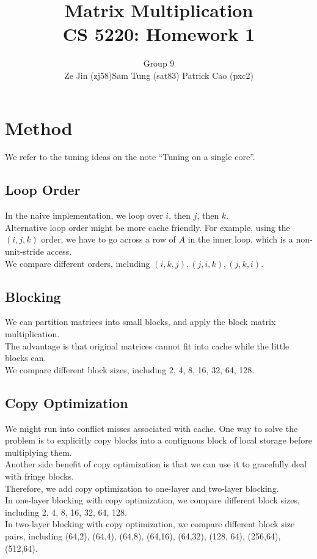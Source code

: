 \documentclass[12pt]{article}
\numberwithin{equation}{section}
\begin{document}
\title{\bf{Matrix Multiplication \\ CS 5220: Homework 1}}

\author{Group 9 \\ Ze Jin (zj58)\quad Sam Tung (sat83) \quad Patrick Cao (pxc2) \\}

\date{ }

\maketitle





\section{Method}

We refer to the tuning ideas on the note ``Tuning on a single core''.

\subsection{Loop Order}

In the naive implementation, we loop over $i$, then $j$, then $k$.
\\
Alternative loop order might be more cache friendly. For example, using the $(i,j,k)$ order, we have to go across a row of $A$ in the inner loop, which is a non-unit-stride access.
\\
We compare different orders, including $(i,k,j), (j,i,k), (j,k,i)$.

\subsection{Blocking}

We can partition matrices into small blocks, and apply the block matrix multiplication.
\\
The advantage is that original matrices cannot fit into cache while the little blocks can.
\\
We compare different block sizes, including 2, 4, 8, 16, 32, 64, 128.

\subsection{Copy Optimization}

We might run into conflict misses associated with cache. One way to solve the problem is to explicitly copy blocks into a contiguous block of local storage before multiplying them.
\\
Another side benefit of copy optimization is that we can use it to gracefully deal with fringe blocks.
\\
Therefore, we add copy optimization to one-layer and two-layer blocking.
\\
In one-layer blocking with copy optimization, we compare different block sizes, including 2, 4, 8, 16, 32, 64, 128.
\\
In two-layer blocking with copy optimization, we compare different block size pairs, including (64,2), (64,4), (64,8), (64,16), (64,32), (128, 64), (256,64), (512,64).
\end{document}
